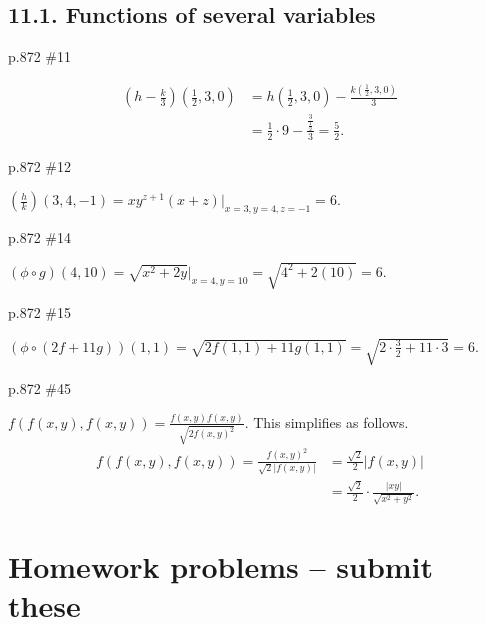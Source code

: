 \subsection*{11.1. Functions of several variables}
\begin{practice}p.872 \#11\end{practice}
\begin{pracsol}
  \[\begin{split}
    \left(h-\frac k3\right)\left(\frac12,3,0\right) &= h\left(\frac12,3,0\right)-\frac{k\left(\frac12,3,0\right)}{3}\\
    &= \frac12\cdot 9-\frac{\frac{3}{\frac12}}{3}=\frac52.
  \end{split}\]
\end{pracsol}
\begin{practice}p.872 \#12\end{practice}
\begin{pracsol}
  $\left(\frac hk\right)(3,4,-1)=xy^{z+1}(x+z)\Big|_{x=3,y=4,z=-1}=6$.
\end{pracsol}
\begin{practice}p.872 \#14\end{practice}
\begin{pracsol}
  $(\phi\circ g)(4,10)=\sqrt{x^2+2y}\Big|_{x=4,y=10}=\sqrt{4^2+2(10)}=6$.
\end{pracsol}
\begin{practice}p.872 \#15\end{practice}
\begin{pracsol}
  $(\phi\circ(2f+11g))(1,1)=\sqrt{2f(1,1)+11g(1,1)}=\sqrt{2\cdot\frac32+11\cdot 3}=6$.
\end{pracsol}
\begin{practice}p.872 \#45\end{practice}
\begin{pracsol}
  $f(f(x,y),f(x,y))=\frac{f(x,y)f(x,y)}{\sqrt{2f(x,y)^2}}$. This simplifies as follows.
  \[\begin{split}
    f(f(x,y),f(x,y)) = \frac{f(x,y)^2}{\sqrt2|f(x,y)|} &= \frac{\sqrt2}{2}|f(x,y)|\\
    &= \frac{\sqrt2}2\cdot\frac{|xy|}{\sqrt{x^2+y^2}}.
  \end{split}\]
\end{pracsol}

\newpage

\section{Homework problems -- submit these}

